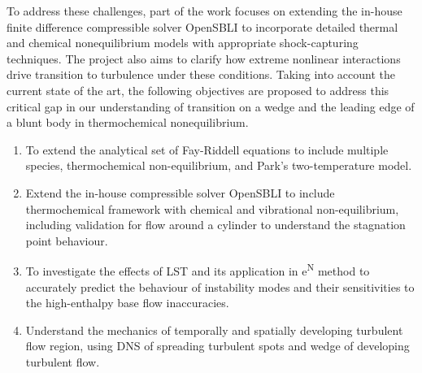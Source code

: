 To address these challenges, part of the work focuses on extending the in-house finite difference compressible solver OpenSBLI to incorporate detailed thermal and chemical nonequilibrium models with appropriate shock-capturing techniques. The project also aims to clarify how extreme nonlinear interactions drive transition to turbulence under these conditions. Taking into account the current state of the art, the following objectives are proposed to address this critical gap in our understanding of transition on a wedge and the leading edge of a blunt body in thermochemical nonequilibrium.


\begin{enumerate}
    \item To extend the analytical set of Fay-Riddell equations to include multiple species,  thermochemical non-equilibrium, and Park's two-temperature model.

    \item Extend the in-house compressible solver OpenSBLI to include thermochemical framework with chemical and vibrational non-equilibrium, including validation for flow around a cylinder to understand the stagnation point behaviour. 
    

    \item To investigate the effects of LST and its application in e\textsuperscript{N} method to accurately predict the behaviour of instability modes and their sensitivities to the high-enthalpy base flow inaccuracies.

    
    \item Understand the mechanics of temporally and spatially developing turbulent flow region, using DNS of spreading turbulent spots and wedge of developing turbulent flow. 

\end{enumerate}



